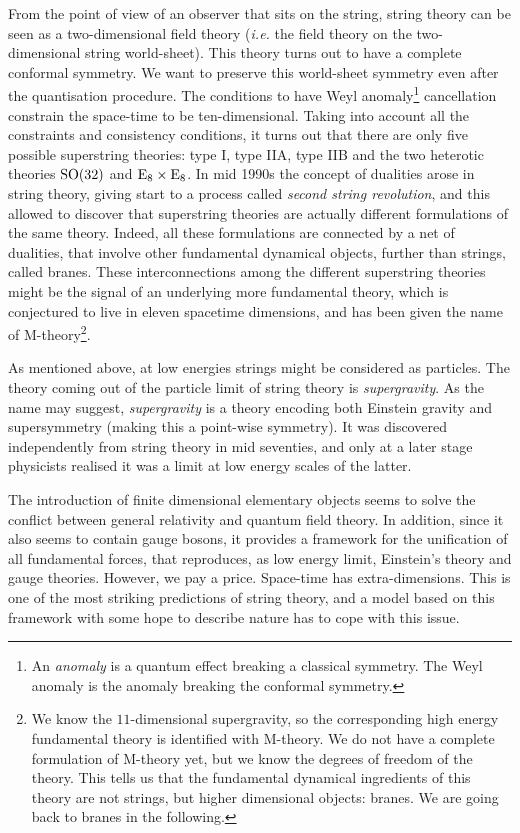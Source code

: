 \documentclass[draft]{phd}
\begin{document}
		From the point of view of an observer that sits on the string, string theory can be seen as a two-dimensional field theory (\emph{i.e.} the field theory on the two-dimensional string world-sheet).
		This theory turns out to have a complete conformal symmetry.
		We want to preserve this world-sheet symmetry even after the quantisation procedure. The conditions to have Weyl anomaly\footnote{%
			An \emph{anomaly} is a quantum effect breaking a classical symmetry. The Weyl anomaly is the anomaly breaking the conformal symmetry.}
		cancellation constrain the space-time to be ten-dimensional.
		Taking into account all the constraints and consistency conditions, it turns out that there are only five possible superstring theories: type I, type IIA, type IIB and the two heterotic theories $\mathrm{SO}(32)$ and $\mathrm{E}_8 \times \mathrm{E}_8$.
		In mid 1990s the concept of dualities arose in string theory, giving start to a process called \emph{second string revolution}, and this allowed to discover that superstring theories are actually different formulations of the same theory.
		Indeed, all these formulations are connected by a net of dualities, that involve other fundamental dynamical objects, further than strings, called branes.
		These interconnections among the different superstring theories might be the signal of an underlying more fundamental theory, which is conjectured to live in eleven spacetime dimensions, and has been given the name of M-theory\footnote{%
			We know the $11$-dimensional supergravity, so the corresponding high energy fundamental theory is identified with M-theory.
			We do not have a complete formulation of M-theory yet, but we know the degrees of freedom of the theory.
			This tells us that the fundamental dynamical ingredients of this theory are not strings, but higher dimensional objects: branes.
			We are going back to branes in the following.}.		
		
		As mentioned above, at low energies strings might be considered as particles. 
		The theory coming out of the particle limit of string theory is \emph{supergravity}.
		As the name may suggest, \emph{supergravity} is a theory encoding both Einstein gravity and supersymmetry (making this a point-wise symmetry).
		It was discovered independently from string theory in mid seventies, and only at a later stage physicists realised it was a limit at low energy scales of the latter.
		
		The introduction of finite dimensional elementary objects seems to solve the conflict between general relativity and quantum field theory. 
		In addition, since it also seems to contain gauge bosons, it provides a framework for the unification of all fundamental forces, that reproduces, as low energy limit, Einstein’s theory and gauge theories.
		However, we pay a price. Space-time has extra-dimensions.
		This is one of the most striking predictions of string theory, and a model based on this framework with some hope to describe nature has to cope with this issue.
		
\end{document}
